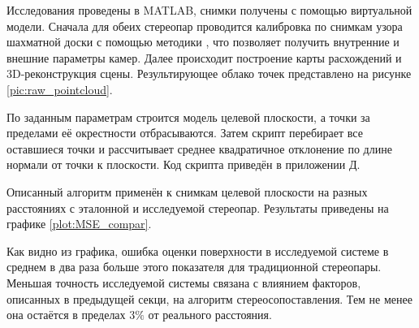 Исследования проведены в MATLAB, снимки получены с помощью виртуальной модели. Сначала для обеих стереопар проводится
калибровка по снимкам узора шахматной доски с помощью методики \cite{stereo_calib}, что позволяет получить 
внутренние и внешние параметры камер. %
Далее происходит построение карты расхождений \cite{SGBM} и 3D-реконструкция сцены. Результирующее облако точек 
представлено на рисунке
\ref{pic:raw_pointcloud}.

По заданным параметрам строится модель целевой плоскости, а точки за пределами её окрестности отбрасываются. %
Затем скрипт перебирает все оставшиеся точки и рассчитывает среднее квадратичное отклонение по длине нормали от 
точки к плоскости. Код скрипта приведён в приложении \hyperlink{app:matlab}{Д}.

Описанный алгоритм применён к снимкам целевой плоскости на разных расстояниях с эталонной и исследуемой стереопар.
Результаты приведены на графике \ref{plot:MSE_compar}.


Как видно из графика, ошибка оценки поверхности в исследуемой системе в среднем в два раза больше этого показателя для
традиционной стереопары. Меньшая точность исследуемой системы связана с влиянием факторов, описанных в предыдущей секци,
на алгоритм стереосопоставления.  Тем не менее она остаётся в пределах $3\%$ от реального расстояния.  %


%